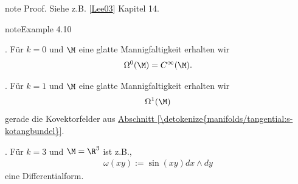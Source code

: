 \documentclass[letterpaper,10pt,german]{jupyterBook}
\begin{document}
\begin{sphinxadmonition}{note}
\sphinxAtStartPar
Proof. Siehe z.B. {[}\hyperlink{cite.references:id18}{Lee03}{]} Kapitel 14.
\end{sphinxadmonition}
\label{manifolds/diffformen:example-4}
\begin{sphinxadmonition}{note}{Example 4.10}



. Für \(k=0\) und \(\M\) eine glatte Mannigfaltigkeit erhalten wir
\begin{equation*}
\begin{split}\Omega^0(\M) = C^\infty(\M).\end{split}
\end{equation*}


. Für \(k=1\) und \(\M\) eine glatte Mannigfaltigkeit erhalten wir
\begin{equation*}
\begin{split}\Omega^1(\M)\end{split}
\end{equation*}
\sphinxAtStartPar
gerade die Kovektorfelder aus \hyperref[\detokenize{manifolds/tangential:s-kotangbundel}]{Abschnitt \ref{\detokenize{manifolds/tangential:s-kotangbundel}}}.



. Für \(k=3\) und \(\M=\R^3\) ist z.B.,
\begin{equation*}
\begin{split}\omega(xy) := \sin(xy) dx\wedge dy\end{split}
\end{equation*}
\sphinxAtStartPar
eine Differentialform.
\end{sphinxadmonition}
\end{document}
